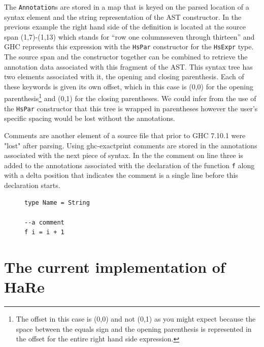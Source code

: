 The \texttt{Annotation}s are stored in a map that is keyed \DIFdelbegin {}\DIFdelend on the parsed location of a syntax element and the string representation of the AST constructor. In the previous example the right hand side of the definition is located at the source span (1,7)-(1,13) which stands for ``row one columns\DIFaddbegin \DIFadd{, }\DIFaddend seven through thirteen'' and GHC represents this expression with the \texttt{HsPar} constructor for the \texttt{HsExpr} type. The source span and the constructor together can be combined to retrieve the annotation data associated with this fragment of the AST. This syntax tree has two elements associated with it, the opening and closing parenthesis. Each of these keywords is given its own offset, which in this case is (0,0) for the opening parenthesis\footnote{The offset in this case is (0,0) and not (0,1) as you might expect because the space between the equals sign and the opening parenthesis is represented in the offset for the entire right hand side expression.} and (0,1) for the closing parentheses. We could \DIFdelbegin {}\DIFdelend infer from the use of the \texttt{HsPar} constructor that this tree is wrapped in parentheses however the user's specific spacing would be lost without the annotations.

Comments are another element of a source file that prior to GHC 7.10.1 were "lost" after parsing. Using ghc-exactprint comments are stored in the annotations associated with the next piece of syntax. In the \DIFdelbegin {}\DIFdelend \DIFaddbegin {}\DIFaddend the comment on line three is added to the annotations associated with the declaration of the function \texttt{f} along with a delta position that indicates the comment is a single line before this declaration starts.

\DIFaddbegin \begin{figure}[t]
\DIFaddendFL \begin{lstlisting}
type Name = String

--a comment
f i = i + 1
\end{lstlisting}
\DIFaddbeginFL \caption{\texttt{}}
\label{commentSnippet}
\end{figure}
\DIFaddend 




\section{The current implementation of HaRe}
\label{hareCurr}

